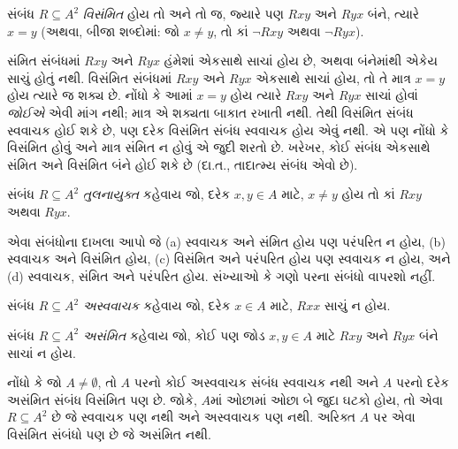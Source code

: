 \begin{defn}[વિસંમિતતા]
સંબંધ $R \subseteq A^2$ \emph{વિસંમિત} હોય તો અને તો જ,
જ્યારે પણ $Rxy$ અને $Ryx$ બંને, ત્યારે $x=y$
(અથવા, બીજા શબ્દોમાં: જો $x\neq y$, તો
કાં $\lnot Rxy$ અથવા $\lnot Ryx$).
\end{defn}

\begin{explain}
સંમિત સંબંધમાં $Rxy$ અને $Ryx$ હંમેશાં એકસાથે સાચાં હોય છે,
અથવા બંનેમાંથી એકેય સાચું હોતું નથી. વિસંમિત સંબંધમાં
$Rxy$ અને $Ryx$ એકસાથે સાચાં હોય, તો તે માત્ર $x = y$
હોય ત્યારે જ શક્ય છે. નોંધો કે આમાં $x = y$ હોય ત્યારે
$Rxy$ અને $Ryx$ સાચાં હોવાં \emph{જોઈએ} એવી માંગ નથી;
માત્ર એ શક્યતા બાકાત રખાતી નથી. તેથી વિસંમિત સંબંધ
સ્વવાચક હોઈ શકે છે, પણ દરેક વિસંમિત સંબંધ સ્વવાચક હોય
એવું નથી. એ પણ નોંધો કે વિસંમિત હોવું અને માત્ર સંમિત
ન હોવું એ જુદી શરતો છે. ખરેખર, કોઈ સંબંધ એકસાથે સંમિત
અને વિસંમિત બંને હોઈ શકે છે (દા.ત., તાદાત્મ્ય સંબંધ એવો છે).
\end{explain}

\begin{defn}[તુલનાયુક્તતા]
સંબંધ $R \subseteq A^2$ \emph{તુલનાયુક્ત} કહેવાય જો,
દરેક $x,y\in A$ માટે, $x \neq y$ હોય તો
કાં $Rxy$ અથવા $Ryx$.
\end{defn}

\begin{prob}
એવા સંબંધોના દાખલા આપો જે (a) સ્વવાચક અને સંમિત હોય પણ
પરંપરિત ન હોય, (b) સ્વવાચક અને વિસંમિત હોય,
(c) વિસંમિત અને પરંપરિત હોય પણ સ્વવાચક ન હોય, અને
(d) સ્વવાચક, સંમિત અને પરંપરિત હોય.
સંખ્યાઓ કે ગણો પરના સંબંધો વાપરશો નહીં.
\end{prob}

\begin{defn}[અસ્વવાચકતા]
સંબંધ $R \subseteq A^2$ \emph{અસ્વવાચક} કહેવાય જો,
દરેક $x \in A$ માટે, $Rxx$ સાચું ન હોય.
\end{defn}

\begin{defn}[અસંમિતતા]
સંબંધ $R \subseteq A^2$ \emph{અસંમિત} કહેવાય જો,
કોઈ પણ જોડ $x,y\in A$ માટે $Rxy$ અને $Ryx$ બંને સાચાં ન હોય.
\end{defn}

નોંધો કે જો $A \neq \emptyset$, તો $A$ પરનો કોઈ અસ્વવાચક
સંબંધ સ્વવાચક નથી અને $A$ પરનો દરેક અસંમિત સંબંધ વિસંમિત
પણ છે. જોકે, $A$માં ઓછામાં ઓછા બે જુદા ઘટકો હોય, તો
એવા $R \subseteq A^2$ છે જે સ્વવાચક પણ નથી અને અસ્વવાચક પણ નથી.
અરિક્ત $A$ પર એવા વિસંમિત સંબંધો પણ છે જે અસંમિત નથી.
\endgroup


